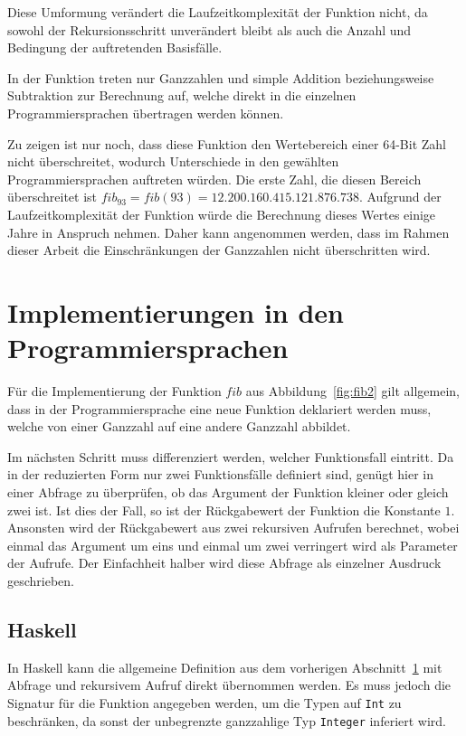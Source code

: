 \documentclass[11pt, parskip=half]{scrartcl}       %
\begin{document}
Diese Umformung verändert die Laufzeitkomplexität der Funktion nicht, da sowohl der Rekursionsschritt unverändert bleibt als auch die Anzahl und Bedingung der auftretenden Basisfälle.

In der Funktion treten nur Ganzzahlen und simple Addition beziehungsweise Subtraktion zur Berechnung auf, welche direkt in die einzelnen Programmiersprachen übertragen werden können.

Zu zeigen ist nur noch, dass diese Funktion den Wertebereich einer 64-Bit Zahl nicht überschreitet, wodurch Unterschiede in den gewählten Programmiersprachen auftreten würden.
Die erste Zahl, die diesen Bereich überschreitet ist $fib_{93} = fib(93) = 12.200.160.415.121.876.738$.
Aufgrund der Laufzeitkomplexität der Funktion würde die Berechnung dieses Wertes einige Jahre in Anspruch nehmen.\cite{aud_landau}
Daher kann angenommen werden, dass im Rahmen dieser Arbeit die Einschränkungen der Ganzzahlen nicht überschritten wird. 


\section{Implementierungen in den Programmiersprachen}
\label{def-fib}

Für die Implementierung der Funktion $fib$ aus Abbildung~\ref{fig:fib2} gilt allgemein, dass in der Programmiersprache eine neue Funktion deklariert werden muss, welche von einer Ganzzahl auf eine andere Ganzzahl abbildet.

Im nächsten Schritt muss differenziert werden, welcher Funktionsfall eintritt.
Da in der reduzierten Form nur zwei Funktionsfälle definiert sind, genügt hier in einer Abfrage zu überprüfen, ob  das Argument der Funktion kleiner oder gleich zwei ist.
Ist dies der Fall, so ist der Rückgabewert der Funktion die Konstante $1$.
Ansonsten wird der Rückgabewert aus zwei rekursiven Aufrufen berechnet, wobei einmal das Argument um eins und einmal um zwei verringert wird als Parameter der Aufrufe.
Der Einfachheit halber wird diese Abfrage als einzelner Ausdruck geschrieben.

\subsection{Haskell}

In Haskell kann die allgemeine Definition aus dem vorherigen Abschnitt~\ref{def-fib} mit Abfrage und rekursivem Aufruf direkt übernommen werden.
Es muss jedoch die Signatur für die Funktion angegeben werden, um die Typen auf \texttt{Int} zu beschränken, da sonst der unbegrenzte ganzzahlige Typ \texttt{Integer} inferiert wird.
\end{document}
